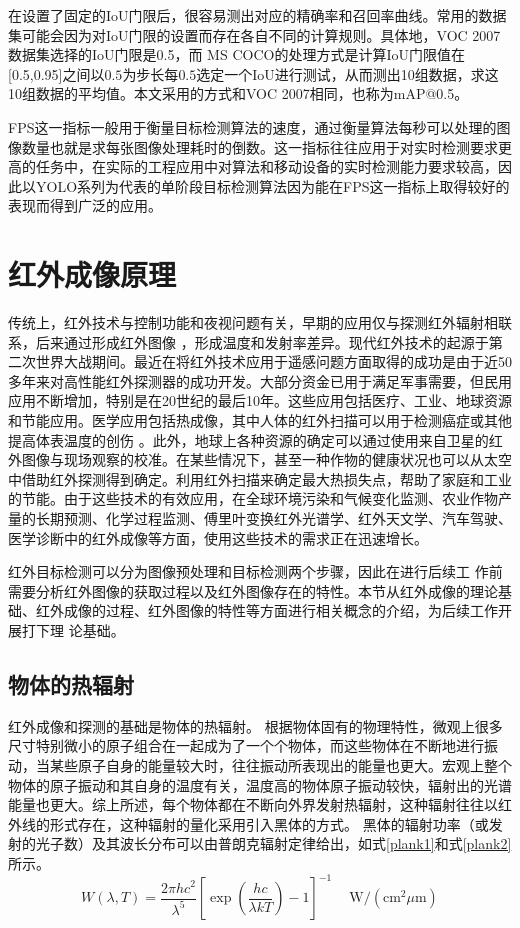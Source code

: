 在设置了固定的IoU门限后，很容易测出对应的精确率和召回率曲线。常用的数据集可能会因为对IoU门限的设置而存在各自不同的计算规则。具体地，VOC 2007数据集选择的IoU门限是0.5，而 MS COCO的处理方式是计算IoU门限值在[0.5,0.95]之间以$0.5$为步长每$0.5$选定一个IoU进行测试，从而测出10组数据，求这10组数据的平均值。本文采用的方式和VOC 2007相同，也称为mAP@0.5。

FPS这一指标一般用于衡量目标检测算法的速度，通过衡量算法每秒可以处理的图像数量也就是求每张图像处理耗时的倒数。这一指标往往应用于对实时检测要求更高的任务中，在实际的工程应用中对算法和移动设备的实时检测能力要求较高，因此以YOLO系列为代表的单阶段目标检测算法因为能在FPS这一指标上取得较好的表现而得到广泛的应用。

\section{红外成像原理}
传统上，红外技术与控制功能和夜视问题有关，早期的应用仅与探测红外辐射相联系，后来通过形成红外图像
，形成温度和发射率差异\cite{rogalski2002infrared}。现代红外技术的起源于第二次世界大战期间。最近在将红外技术应用于遥感问题方面取得的成功是由于近50多年来对高性能红外探测器的成功开发。大部分资金已用于满足军事需要，但民用应用不断增加，特别是在20世纪的最后10年。这些应用包括医疗、工业、地球资源和节能应用。医学应用包括热成像，其中人体的红外扫描可以用于检测癌症或其他提高体表温度的创伤
。此外，地球上各种资源的确定可以通过使用来自卫星的红外图像与现场观察的校准。在某些情况下，甚至一种作物的健康状况也可以从太空中借助红外探测得到确定。利用红外扫描来确定最大热损失点，帮助了家庭和工业的节能。由于这些技术的有效应用，在全球环境污染和气候变化监测、农业作物产量的长期预测、化学过程监测、傅里叶变换红外光谱学、红外天文学、汽车驾驶、医学诊断中的红外成像等方面，使用这些技术的需求正在迅速增长。

红外目标检测可以分为图像预处理和目标检测两个步骤，因此在进行后续工
作前需要分析红外图像的获取过程以及红外图像存在的特性。本节从红外成像的理论基础、红外成像的过程、红外图像的特性等方面进行相关概念的介绍，为后续工作开展打下理
论基础。
\subsection{物体的热辐射}
红外成像和探测的基础是物体的热辐射。
根据物体固有的物理特性，微观上很多尺寸特别微小的原子组合在一起成为了一个个物体，而这些物体在不断地进行振动，当某些原子自身的能量较大时，往往振动所表现出的能量也更大。宏观上整个物体的原子振动和其自身的温度有关，温度高的物体原子振动较快，辐射出的光谱能量也更大。综上所述，每个物体都在不断向外界发射热辐射，这种辐射往往以红外线的形式存在，这种辐射的量化采用引入黑体的方式。
黑体的辐射功率（或发射的光子数）及其波长分布可以由普朗克辐射定律给出，如式\ref{plank1}和式\ref{plank2}所示。
\begin{equation}
    W(\lambda, T)=\frac{2 \pi h c^{2}}{\lambda^{5}}\left[\exp \left(\frac{h c}{\lambda k T}\right)-1\right]^{-1} \quad \mathrm{~W} /\left(\mathrm{cm}^{2} \mu \mathrm{m}\right)
    \label{plank1}
\end{equation}

